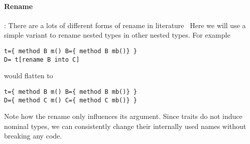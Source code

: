 \paragraph{Rename}:
There are a lots of different forms of rename in
literature~\cite{deep,ancona2002calculus,bracha1992programming}
Here we will use a simple variant to rename nested types in other nested types.
For example 
\begin{lstlisting}
t={ method B m() B={ method B mb()} }
D= t[rename B into C]
\end{lstlisting}
would flatten to 
\begin{lstlisting}
t={ method B m() B={ method B mb()} }
D={ method C m() C={ method C mb()} }
\end{lstlisting}
Note how the rename only influences its argument.
Since traits do not induce nominal types, we can
consistently change their
internally used names without breaking any code.

%
%
% 
%



